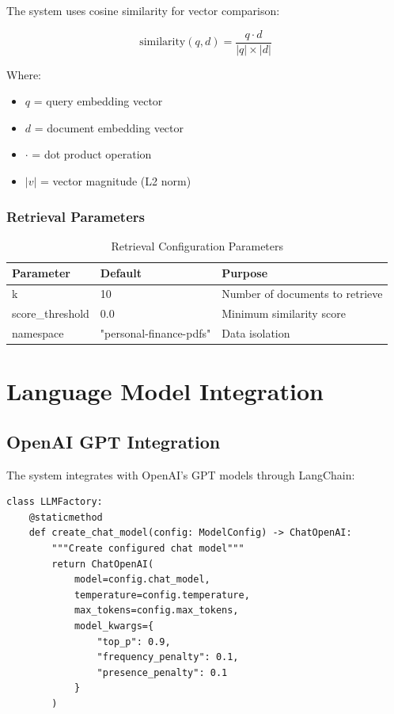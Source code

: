 \documentclass[12pt,a4paper]{article}
\begin{document}
The system uses cosine similarity for vector comparison:

$$\text{similarity}(q, d) = \frac{q \cdot d}{|q| \times |d|}$$

Where:
\begin{itemize}
    \item $q$ = query embedding vector
    \item $d$ = document embedding vector
    \item $\cdot$ = dot product operation
    \item $|v|$ = vector magnitude (L2 norm)
\end{itemize}

\subsubsection{Retrieval Parameters}

\begin{table}[H]
\centering
\begin{tabular}{@{}lll@{}}
\toprule
\textbf{Parameter} & \textbf{Default} & \textbf{Purpose} \\
\midrule
k & 10 & Number of documents to retrieve \\
score\_threshold & 0.0 & Minimum similarity score \\
namespace & "personal-finance-pdfs" & Data isolation \\
\bottomrule
\end{tabular}
\caption{Retrieval Configuration Parameters}
\end{table}

\section{Language Model Integration}

\subsection{OpenAI GPT Integration}

The system integrates with OpenAI's GPT models through LangChain:

\begin{lstlisting}[caption=Language Model Factory]
class LLMFactory:
    @staticmethod
    def create_chat_model(config: ModelConfig) -> ChatOpenAI:
        """Create configured chat model"""
        return ChatOpenAI(
            model=config.chat_model,
            temperature=config.temperature,
            max_tokens=config.max_tokens,
            model_kwargs={
                "top_p": 0.9,
                "frequency_penalty": 0.1,
                "presence_penalty": 0.1
            }
        )
\end{lstlisting}
\end{document}

